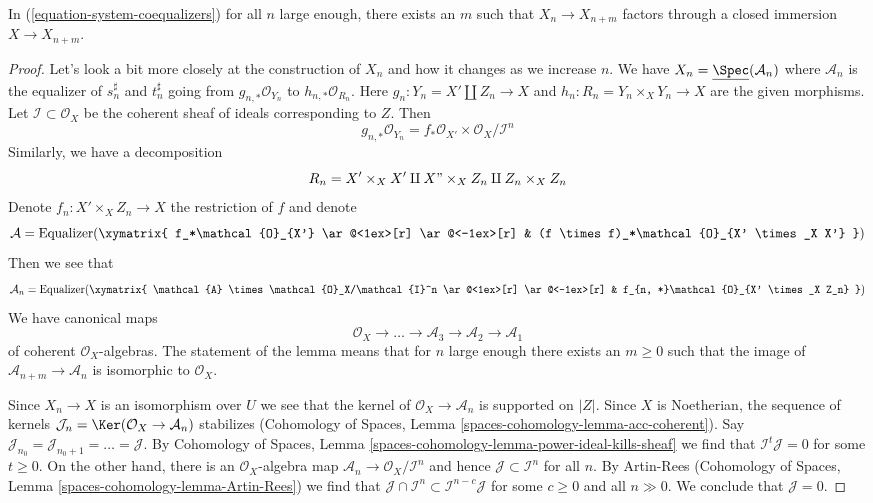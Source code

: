 \begin{lemma}
\label{lemma-essentially-constant}
In (\ref{equation-system-coequalizers}) for all $n$ large enough, there
exists an $m$ such that $X_n \to X_{n + m}$ factors through a
closed immersion $X \to X_{n + m}$.
\end{lemma}

\begin{proof}
Let's look a bit more closely at the construction of $X_n$
and how it changes as we increase $n$. We have
$X_n = \underline{\Spec}(\mathcal{A}_n)$
where $\mathcal{A}_n$ is the equalizer of $s_n^\sharp$ and $t_n^\sharp$
going from $g_{n , *}\mathcal{O}_{Y_n}$ to $h_{n, *}\mathcal{O}_{R_n}$.
Here $g_n : Y_n = X' \amalg Z_n \to X$ and $h_n : R_n = Y_n \times_X Y_n \to X$
are the given morphisms. Let $\mathcal{I} \subset \mathcal{O}_X$ be the
coherent sheaf of ideals corresponding to $Z$. Then
$$
g_{n, *}\mathcal{O}_{Y_n} =
f_*\mathcal{O}_{X'} \times \mathcal{O}_X/\mathcal{I}^n
$$
Similarly, we have a decomposition
$$
R_n = X' \times_X X' \amalg X" \times_X Z_n \amalg Z_n \times_X Z_n
$$
Denote $f_n : X' \times_X Z_n \to X$ the restriction of $f$
and denote
$$
\mathcal{A} = \text{Equalizer}(
\xymatrix{
f_*\mathcal{O}_{X'} \ar@<1ex>[r] \ar@<-1ex>[r] &
(f \times f)_*\mathcal{O}_{X' \times_X X'}
}
)
$$
Then we see that
$$
\mathcal{A}_n =
\text{Equalizer}(
\xymatrix{
\mathcal{A} \times \mathcal{O}_X/\mathcal{I}^n \ar@<1ex>[r] \ar@<-1ex>[r] &
f_{n, *}\mathcal{O}_{X' \times_X Z_n}
}
)
$$
We have canonical maps
$$
\mathcal{O}_X \to \ldots \to \mathcal{A}_3 \to \mathcal{A}_2 \to \mathcal{A}_1
$$
of coherent $\mathcal{O}_X$-algebras. The statement of the lemma means that
for $n$ large enough there exists an $m \geq 0$ such that the image of
$\mathcal{A}_{n + m} \to \mathcal{A}_n$ is isomorphic to $\mathcal{O}_X$.

\medskip\noindent
Since $X_n \to X$ is an isomorphism over $U$ we see that the kernel
of $\mathcal{O}_X \to \mathcal{A}_n$ is supported on $|Z|$.
Since $X$ is Noetherian, the sequence of kernels
$\mathcal{J}_n = \Ker(\mathcal{O}_X \to \mathcal{A}_n)$ stabilizes
(Cohomology of Spaces, Lemma \ref{spaces-cohomology-lemma-acc-coherent}).
Say $\mathcal{J}_{n_0} = \mathcal{J}_{n_0 + 1} = \ldots = \mathcal{J}$.
By Cohomology of Spaces, Lemma
\ref{spaces-cohomology-lemma-power-ideal-kills-sheaf}
we find that $\mathcal{I}^t \mathcal{J} = 0$ for some $t \geq 0$.
On the other hand, there is an $\mathcal{O}_X$-algebra map
$\mathcal{A}_n \to \mathcal{O}_X/\mathcal{I}^n$
and hence $\mathcal{J} \subset \mathcal{I}^n$ for all $n$.
By Artin-Rees (Cohomology of Spaces, Lemma
\ref{spaces-cohomology-lemma-Artin-Rees}) we find that
$\mathcal{J} \cap \mathcal{I}^n \subset \mathcal{I}^{n - c}\mathcal{J}$
for some $c  \geq 0$ and all $n \gg 0$. We conclude that $\mathcal{J} = 0$.


\end{proof}
